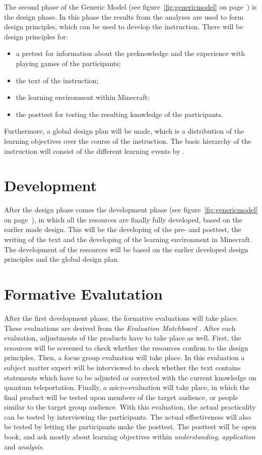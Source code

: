 \documentclass[12pt]{report} %
\begin{document}
The second phase of the Generic Model \cite{genericmodel} (see figure~\ref{fig:genericmodel} on page~\pageref{genericmodel}) is the design phase. In this phase the results from the analyses are used to form design principles, which can be used to develop the instruction. There will be design principles for:
\begin{itemize}
\item a pretest for information about the preknowledge and the experience with playing games of the participants;
\item the text of the instruction;
\item the learning environment within Minecraft;
\item the posttest for testing the resulting knowledge of the participants.
\end{itemize}
Furthermore, a global design plan will be made, which is a distribution of the learning objectives over the course of the instruction. The basic hierarchy of the instruction will consist of the different learning events by .

\section{Development}

After the design phase comes the development phase \cite{genericmodel} (see figure~\ref{fig:genericmodel} on page~\pageref{genericmodel}), in which all the resources are finally fully developed, based on the earlier made design. This will be the developing of the pre- and posttest, the writing of the text and the developing of the learning environment in Minecraft. The development of the resources will be based on the earlier developed design principles and the global design plan.

\section{Formative Evalutation}

After the first development phase, the formative evaluations will take place. These evaluations are derived from the \emph{Evaluation Matchboard} \cite{evamatchboard}. After each evaluation, adjustments of the products have to take place as well. First, the resources will be screened to check whether the resources confirm to the design principles. Then, a focus group evaluation will take place. In this evaluation a subject matter expert will be interviewed to check whether the text contains statements which have to be adjusted or corrected with the current knowledge on quantum teleportation. Finally, a micro-evaluation will take place, in which the final product will be tested upon members of the target audience, or people similar to the target group audience. With this evaluation, the actual practicality can be tested by interviewing the participants. The actual effectiveness will also be tested by letting the participants make the posttest. The posttest will be open book, and ask mostly about learning objectives within \emph{understanding}, \emph{application} and \emph{analysis}.
\end{document}
